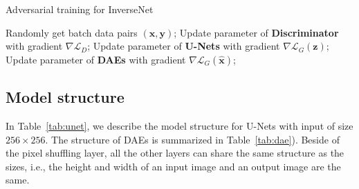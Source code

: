\documentclass[10pt,twocolumn,letterpaper]{article}
\begin{document}
\begin{appendices}
\begin{algorithm}
		\caption{Adversarial training for InverseNet}
		\label{alg:InverseNet}
		\begin{algorithmic}
		  \STATE Randomly get batch data pairs $(\mathbf{x}, \mathbf{y})$;
				\STATE Update parameter of \textbf{Discriminator} with gradient $\nabla \mathcal{L}_D$;
     \ENDFOR
			\STATE Update parameter of \textbf{U-Nets} with gradient $\nabla \mathcal{L}_G(\mathbf{z})$;
			\STATE Update parameter of \textbf{DAEs} with gradient $\nabla \mathcal{L}_G(\hat{\mathbf{x}})$;
		\ENDFOR
		\end{algorithmic}
\end{algorithm}

\subsection{Model structure}

In Table~\ref{tab:unet}, we describe the model structure for U-Nets with input of size $256 \times 256$.
The structure of DAEs is summarized in Table~\ref{tab:dae}). 
Beside of the pixel shuffling layer, all the other layers can share the same structure as the sizes, i.e., the height and width of an input image
and an output image are the same.


\end{appendices}
\end{document}
